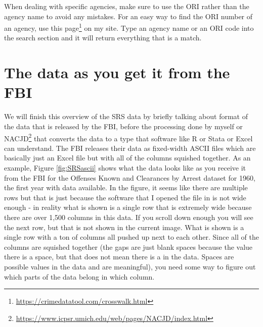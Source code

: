 \documentclass[
]{krantz}
\renewcommand{\href}[2]{#2\footnote{\url{#1}}}
\begin{document}
When dealing with specific agencies, make sure to use the
ORI rather than the agency name to avoid any mistakes. For
an easy way to find the ORI number of an agency, use
\href{https://crimedatatool.com/crosswalk.html}{this page}
on my site. Type an agency name or an ORI code into the
search section and it will return everything that is a
match.

\section{The data as you get it from the
FBI}\label{the-data-as-you-get-it-from-the-fbi}

We will finish this overview of the SRS data by briefly
talking about format of the data that is released by the
FBI, before the processing done by myself or
\href{https://www.icpsr.umich.edu/web/pages/NACJD/index.html}{NACJD}
that converts the data to a type that software like R or
Stata or Excel can understand. The FBI releases their data
as fixed-width ASCII files which are basically just an Excel
file but with all of the columns squished together. As an
example, Figure \ref{fig:SRSascii} shows what the data looks
like as you receive it from the FBI for the Offenses Known
and Clearances by Arrest dataset for 1960, the first year
with data available. In the figure, it seems like there are
multiple rows but that is just because the software that I
opened the file in is not wide enough - in reality what is
shown is a single row that is extremely wide because there
are over 1,500 columns in this data. If you scroll down
enough you will see the next row, but that is not shown in
the current image. What is shown is a single row with a ton
of columns all pushed up next to each other. Since all of
the columns are squished together (the gaps are just blank
spaces because the value there is a space, but that does not
mean there is a in the data. Spaces are possible values in
the data and are meaningful), you need some way to figure
out which parts of the data belong in which column.
\end{document}
